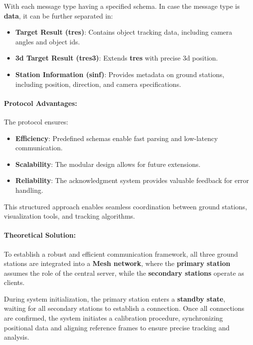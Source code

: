 With each message type having a specified schema. In case the message type is \textbf{data}, it can be further separated in:

\begin{itemize}
	\item \textbf{Target Result (tres)}: Contains object tracking data, including camera angles and object \acrshort{id}s.
	\item \textbf{\acrshort{3d} Target Result (tres3)}: Extends \textbf{tres} with precise \acrshort{3d} position.
	\item \textbf{Station Information (sinf)}: Provides metadata on ground stations, including position, direction, and camera specifications.
\end{itemize}

\paragraph{Protocol Advantages:}

The protocol ensures:
\begin{itemize}
	\item \textbf{Efficiency}: Predefined schemas enable fast parsing and low-latency communication.
	\item \textbf{Scalability}: The modular design allows for future extensions.
	\item \textbf{Reliability}: The acknowledgment system provides valuable feedback for error handling.
\end{itemize}

This structured approach enables seamless coordination between ground stations, visualization tools, and tracking algorithms.

\paragraph{Theoretical Solution:}  
To establish a robust and efficient communication framework, all three ground stations are integrated into a \textbf{Mesh network}, where the \textbf{primary station} assumes the role of the central server, while the \textbf{secondary stations} operate as clients.

During system initialization, the primary station enters a \textbf{standby state}, waiting for all secondary stations to establish a connection. Once all connections are confirmed, the system initiates a calibration procedure, synchronizing positional data and aligning reference frames to ensure precise tracking and analysis.  

